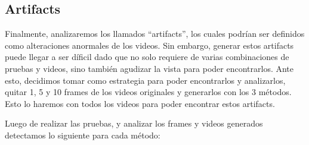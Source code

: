 \subsection{Artifacts}

Finalmente, analizaremos los llamados ``artifacts'', los cuales podr\'ian ser definidos como alteraciones anormales de los videos. Sin embargo, generar estos artifacts puede llegar a ser d\'ificil dado que no solo requiere de varias combinaciones de pruebas y videos, sino tambi\'en agudizar la vista para poder encontrarlos. Ante esto, decidimos tomar como estrategia para poder encontrarlos y analizarlos, quitar 1, 5 y 10 frames de los videos originales y generarlos con los 3 m\'etodos. Esto lo haremos con todos los videos para poder encontrar estos artifacts.

Luego de realizar las pruebas, y analizar los frames y videos generados detectamos lo siguiente para cada m\'etodo:

